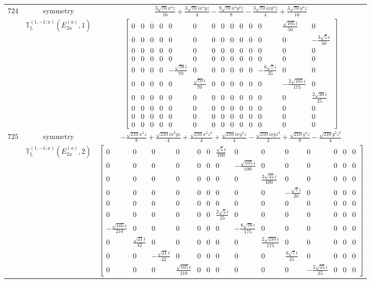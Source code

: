 \documentclass[fleqn,8pt,landscape]{jsarticle}
\begin{document}
\begin{longtable}{ccc}
$ 724 $ & $ \text{symmetry} $ & $ \frac{3 \sqrt{70} x^{4} z}{16} + \frac{3 \sqrt{70} i x^{3} y z}{4} - \frac{9 \sqrt{70} x^{2} y^{2} z}{8} - \frac{3 \sqrt{70} i x y^{3} z}{4} + \frac{3 \sqrt{70} y^{4} z}{16} $ \\
$  $ & $ \mathbb{T}_{5}^{(1,-1;a)}(E_{2u}^{(a)},1) $ & $ \begin{bmatrix} 0 & 0 & 0 & 0 & 0 & 0 & 0 & 0 & 0 & 0 & 0 & 0 & \frac{\sqrt{105} i}{50} & 0 \\ 0 & 0 & 0 & 0 & 0 & 0 & 0 & 0 & 0 & 0 & 0 & 0 & 0 & - \frac{3 \sqrt{5} i}{50} \\ 0 & 0 & 0 & 0 & 0 & 0 & 0 & 0 & 0 & 0 & 0 & 0 & 0 & 0 \\ 0 & 0 & 0 & 0 & 0 & 0 & 0 & 0 & 0 & 0 & 0 & 0 & 0 & 0 \\ 0 & 0 & 0 & 0 & - \frac{\sqrt{70} i}{70} & 0 & 0 & 0 & 0 & 0 & 0 & - \frac{6 \sqrt{7} i}{35} & 0 & 0 \\ 0 & 0 & 0 & 0 & 0 & \frac{\sqrt{70} i}{70} & 0 & 0 & 0 & 0 & 0 & 0 & - \frac{2 \sqrt{105} i}{175} & 0 \\ 0 & 0 & 0 & 0 & 0 & 0 & 0 & 0 & 0 & 0 & 0 & 0 & 0 & \frac{2 \sqrt{30} i}{25} \\ 0 & 0 & 0 & 0 & 0 & 0 & 0 & 0 & 0 & 0 & 0 & 0 & 0 & 0 \\ 0 & 0 & 0 & 0 & 0 & 0 & 0 & 0 & 0 & 0 & 0 & 0 & 0 & 0 \\ 0 & 0 & 0 & 0 & 0 & 0 & 0 & 0 & 0 & 0 & 0 & 0 & 0 & 0 \end{bmatrix} $ \\ \hline
$ 725 $ & $ \text{symmetry} $ & $ - \frac{\sqrt{210} x^{4} z}{8} + \frac{\sqrt{210} i x^{3} y z}{4} + \frac{\sqrt{210} x^{2} z^{3}}{4} + \frac{\sqrt{210} i x y^{3} z}{4} - \frac{\sqrt{210} i x y z^{3}}{2} + \frac{\sqrt{210} y^{4} z}{8} - \frac{\sqrt{210} y^{2} z^{3}}{4} $ \\
$  $ & $ \mathbb{T}_{5}^{(1,-1;a)}(E_{2u}^{(a)},2) $ & $ \begin{bmatrix} 0 & 0 & 0 & 0 & 0 & 0 & \frac{\sqrt{5} i}{100} & 0 & 0 & 0 & 0 & 0 & 0 & 0 \\ 0 & 0 & 0 & 0 & 0 & 0 & 0 & - \frac{\sqrt{105} i}{100} & 0 & 0 & 0 & 0 & 0 & 0 \\ 0 & 0 & 0 & 0 & 0 & 0 & 0 & 0 & \frac{3 \sqrt{35} i}{100} & 0 & 0 & 0 & 0 & 0 \\ 0 & 0 & 0 & 0 & 0 & 0 & 0 & 0 & 0 & - \frac{\sqrt{7} i}{20} & 0 & 0 & 0 & 0 \\ 0 & 0 & 0 & 0 & 0 & 0 & 0 & 0 & 0 & 0 & 0 & 0 & 0 & 0 \\ 0 & 0 & 0 & 0 & 0 & 0 & \frac{2 \sqrt{5} i}{25} & 0 & 0 & 0 & 0 & 0 & 0 & 0 \\ - \frac{\sqrt{105} i}{210} & 0 & 0 & 0 & 0 & 0 & 0 & - \frac{8 \sqrt{70} i}{175} & 0 & 0 & 0 & 0 & 0 & 0 \\ 0 & \frac{\sqrt{21} i}{42} & 0 & 0 & 0 & 0 & 0 & 0 & \frac{2 \sqrt{210} i}{175} & 0 & 0 & 0 & 0 & 0 \\ 0 & 0 & - \frac{\sqrt{21} i}{42} & 0 & 0 & 0 & 0 & 0 & 0 & \frac{4 \sqrt{7} i}{35} & 0 & 0 & 0 & 0 \\ 0 & 0 & 0 & \frac{\sqrt{105} i}{210} & 0 & 0 & 0 & 0 & 0 & 0 & - \frac{2 \sqrt{35} i}{35} & 0 & 0 & 0 \end{bmatrix} $ \\ \hline

\end{longtable}
\end{document}
